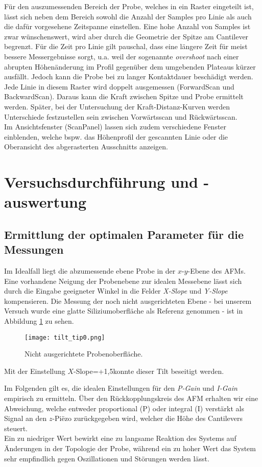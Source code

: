 Für den auszumessenden Bereich der Probe, welches in ein Raster eingeteilt ist, lässt sich neben dem Bereich sowohl die Anzahl der Samples pro Linie als auch die dafür vorgesehene Zeitspanne einstellen. Eine hohe Anzahl von Samples ist zwar wünschenswert, wird aber durch die Geometrie der Spitze am Cantilever begrenzt. Für die Zeit pro Linie gilt pauschal, dass eine längere Zeit für meist bessere Messergebnisse sorgt, u.a. weil der sogenannte \emph{overshoot} nach einer abrupten Höhenänderung im Profil gegenüber dem umgebenden Plateaus kürzer ausfällt. Jedoch kann die Probe bei zu langer Kontaktdauer beschädigt werden.\\
Jede Linie in diesem Raster wird doppelt ausgemessen (ForwardScan und BackwardScan). Daraus kann die Kraft zwischen Spitze und Probe ermittelt werden. Später, bei der Untersuchung der Kraft-Distanz-Kurven werden Unterschiede festzustellen sein zwischen Vorwärtsscan und Rückwärtsscan.\\
Im Ansichtsfenster (ScanPanel) lassen sich zudem verschiedene Fenster einblenden, welche bspw. das Höhenprofil der gescannten Linie oder die Oberansicht des abgerasterten Ausschnitts anzeigen.
\section{Versuchsdurchführung und -auswertung} 
\subsection{Ermittlung der optimalen Parameter für die Messungen}
Im Idealfall liegt die abzumessende ebene Probe in der $x$-$y$-Ebene des AFMs. Eine vorhandene Neigung der Probenebene zur idealen Messebene lässt sich durch die Eingabe geeigneter Winkel in die Felder \emph{X-Slope} und \emph{Y-Slope} kompensieren. Die Messung der noch nicht ausgerichteten Ebene - bei unserem Versuch wurde eine glatte Siliziumoberfläche %
als Referenz genommen - ist in Abbildung \ref{fig:tilt} zu sehen.
\begin{figure}[h]
	\centering
	\texttt{[image: tilt\_tip0.png]}
	\caption{Nicht ausgerichtete Probenoberfläche.}
	\label{fig:tilt}
\end{figure}
Mit der Einstellung $X$-Slope=+1,5\degree konnte dieser Tilt beseitigt werden.

Im Folgenden gilt es, die idealen Einstellungen für den \emph{P-Gain} und \emph{I-Gain} empirisch zu ermitteln. Über den Rückkopplungskreis des AFM erhalten wir eine Abweichung, welche entweder proportional (P) oder integral (I) verstärkt als Signal an den $z$-Pi\"{e}zo zurückgegeben wird, welcher die Höhe des Cantilevers steuert.\\
Ein zu niedriger Wert bewirkt eine zu langsame Reaktion des Systems auf Änderungen in der Topologie der Probe, während ein zu hoher Wert das System sehr empfindlich gegen Oszillationen und Störungen werden lässt.

